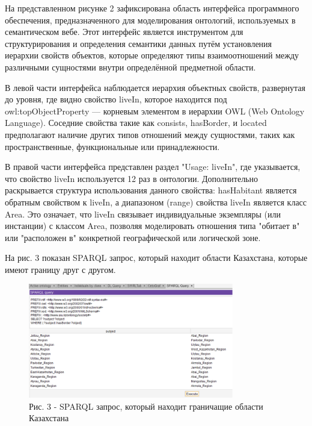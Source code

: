 \begin{multicols}{2}
На представленном рисунке 2 зафиксирована область интерфейса
программного обеспечения, предназначенного для моделирования онтологий,
используемых в семантическом вебе. Этот интерфейс является инструментом
для структурирования и определения семантики данных путём установления
иерархии свойств объектов, которые определяют типы взаимоотношений между
различными сущностями внутри определённой предметной области.

В левой части интерфейса наблюдается иерархия объектных свойств,
развернутая до уровня, где видно свойство
\textquotesingle liveIn\textquotesingle, которое находится под
\textquotesingle owl:topObjectProperty\textquotesingle{} --- корневым
элементом в иерархии OWL (Web Ontology Language). Соседние свойства
такие как \textquotesingle consists\textquotesingle,
\textquotesingle hasBorder\textquotesingle, и
\textquotesingle located\textquotesingle{} предполагают наличие других
типов отношений между сущностями, таких как пространственные,
функциональные или принадлежности.

В правой части интерфейса представлен раздел "Usage: liveIn", где
указывается, что свойство \textquotesingle liveIn\textquotesingle{}
используется 12 раз в онтологии. Дополнительно раскрывается структура
использования данного свойства:
\textquotesingle hasHabitant\textquotesingle{} является обратным
свойством к \textquotesingle liveIn\textquotesingle, а диапазоном
(range) свойства \textquotesingle liveIn\textquotesingle{} является
класс \textquotesingle Area\textquotesingle. Это означает, что
\textquotesingle liveIn\textquotesingle{} связывает индивидуальные
экземпляры (или инстанции) с классом
\textquotesingle Area\textquotesingle, позволяя моделировать отношения
типа "обитает в" или "расположен в" конкретной географической или
логической зоне.

На рис. 3 показан SPARQL запрос, который находит области Казахстана,
которые имеют границу друг с другом.
\end{multicols}

\begin{figure}[H]
	\centering
	\includegraphics[width=0.8\textwidth]{assets/40}
	\caption*{Рис. 3 - SPARQL запрос, который находит граничащие области Казахстана}
\end{figure}


